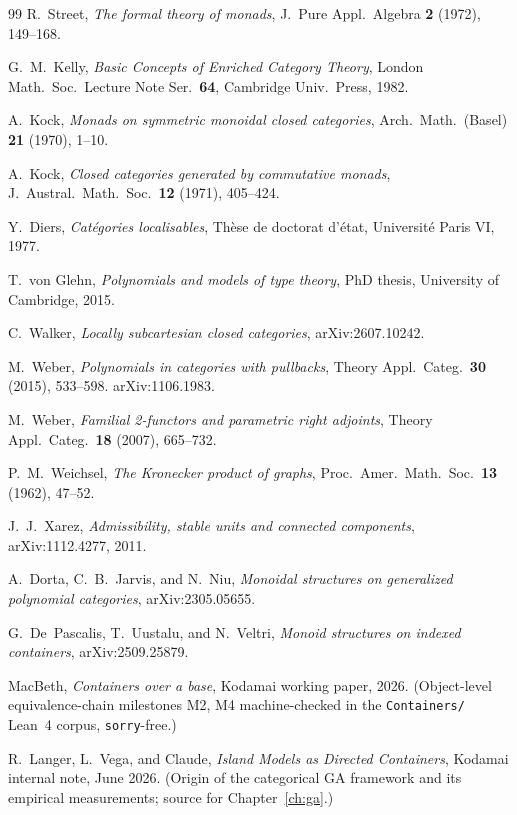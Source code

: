 \documentclass[11pt]{report}
\theoremstyle{plain}
\theoremstyle{definition}
\theoremstyle{remark}
\begin{document}
\begin{thebibliography}{99}
 R.~Street, \emph{The formal theory of monads}, J.\ Pure Appl.\ Algebra \textbf{2} (1972), 149--168.

 G.~M.~Kelly, \emph{Basic Concepts of Enriched Category Theory}, London Math.\ Soc.\ Lecture Note Ser.\ \textbf{64}, Cambridge Univ.\ Press, 1982.

 A.~Kock, \emph{Monads on symmetric monoidal closed categories}, Arch.\ Math.\ (Basel) \textbf{21} (1970), 1--10.

 A.~Kock, \emph{Closed categories generated by commutative monads}, J.\ Austral.\ Math.\ Soc.\ \textbf{12} (1971), 405--424.

 Y.~Diers, \emph{Cat\'egories localisables}, Th\`ese de doctorat d'\'etat, Universit\'e Paris VI, 1977.

 T.~von Glehn, \emph{Polynomials and models of type theory}, PhD thesis, University of Cambridge, 2015.

 C.~Walker, \emph{Locally subcartesian closed categories}, arXiv:2607.10242.

 M.~Weber, \emph{Polynomials in categories with pullbacks}, Theory Appl.\ Categ.\ \textbf{30} (2015), 533--598. arXiv:1106.1983.

 M.~Weber, \emph{Familial 2-functors and parametric right adjoints}, Theory Appl.\ Categ.\ \textbf{18} (2007), 665--732.

 P.~M.~Weichsel, \emph{The Kronecker product of graphs}, Proc.\ Amer.\ Math.\ Soc.\ \textbf{13} (1962), 47--52.

 J.~J.~Xarez, \emph{Admissibility, stable units and connected components}, arXiv:1112.4277, 2011.

 A.~Dorta, C.~B.~Jarvis, and N.~Niu, \emph{Monoidal structures on generalized polynomial categories}, arXiv:2305.05655.

 G.~De~Pascalis, T.~Uustalu, and N.~Veltri, \emph{Monoid structures on indexed containers}, arXiv:2509.25879.

 MacBeth, \emph{Containers over a base}, Kodamai working paper, 2026. (Object-level equivalence-chain milestones M2, M4 machine-checked in the \texttt{Containers/} Lean~4 corpus, \texttt{sorry}-free.)

 R.~Langer, L.~Vega, and Claude, \emph{Island Models as Directed Containers}, Kodamai internal note, June 2026. (Origin of the categorical GA framework and its empirical measurements; source for Chapter~\ref{ch:ga}.)

\end{thebibliography}
\end{document}
